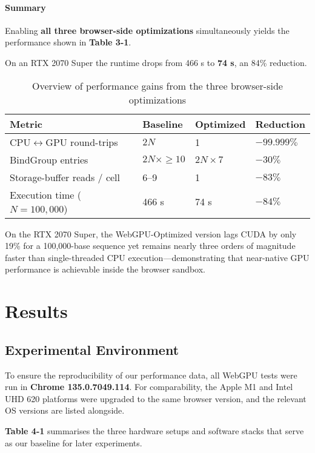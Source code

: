 \documentclass[PhD]{PHlab-thesis}
\begin{document}
\subsubsection{Summary}
Enabling \textbf{all three browser-side optimizations} simultaneously yields the performance shown in \textbf{Table 3-1}.

On an RTX 2070 Super the runtime drops from 466 s to \textbf{74 s}, an 84\% reduction.

\begin{table}[h]
    \centering
    \begin{tabularx}{\textwidth}{|X|X|X|X|}
        \hline
        Metric & Baseline & Optimized & Reduction \\
        \hline
        CPU$\leftrightarrow$GPU round-trips & $2N$ & 1 & $-99.999\%$ \\
        BindGroup entries & $2N \times \geq 10$ & $2N \times 7$ & $-30\%$ \\
        Storage-buffer reads / cell & 6–9 & 1 & $-83\%$ \\
        Execution time ($N = 100,000$) & 466 s & 74 s & $-84\%$ \\
        \hline
    \end{tabularx}
    \caption{Overview of performance gains from the three browser-side optimizations}
    \label{tab:opt_performance}
\end{table}

On the RTX 2070 Super, the WebGPU-Optimized version lags CUDA by only 19\% for a 100,000-base sequence yet remains nearly three orders of magnitude faster than single-threaded CPU execution—demonstrating that near-native GPU performance is achievable inside the browser sandbox.

	
\chapter{Results}
\section{Experimental Environment}
To ensure the reproducibility of our performance data, all WebGPU tests were run in \textbf{Chrome 135.0.7049.114}.
For comparability, the Apple M1 and Intel UHD 620 platforms were upgraded to the same browser version, and the relevant OS versions are listed alongside.

\textbf{Table 4-1} summarises the three hardware setups and software stacks that serve as our baseline for later experiments.
\end{document}
